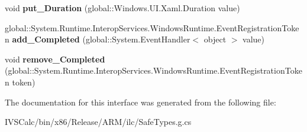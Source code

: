 \begin{DoxyCompactItemize}
\mbox{\label{interface_windows_1_1_u_i_1_1_xaml_1_1_media_1_1_animation_1_1_i_timeline_aa1793004fef03b01c0341256ede164d9}} 
void {\bfseries put\+\_\+\+Duration} (global\+::\+Windows.\+U\+I.\+Xaml.\+Duration value)
\item 
\mbox{\label{interface_windows_1_1_u_i_1_1_xaml_1_1_media_1_1_animation_1_1_i_timeline_a7ee61c5d3a53c5f8570e743522b52866}} 
global\+::\+System.\+Runtime.\+Interop\+Services.\+Windows\+Runtime.\+Event\+Registration\+Token {\bfseries add\+\_\+\+Completed} (global\+::\+System.\+Event\+Handler$<$ object $>$ value)
\item 
\mbox{\label{interface_windows_1_1_u_i_1_1_xaml_1_1_media_1_1_animation_1_1_i_timeline_a633d5239301849202b3e61b320bed13b}} 
void {\bfseries remove\+\_\+\+Completed} (global\+::\+System.\+Runtime.\+Interop\+Services.\+Windows\+Runtime.\+Event\+Registration\+Token token)
\end{DoxyCompactItemize}


The documentation for this interface was generated from the following file\+:\begin{DoxyCompactItemize}
\item 
I\+V\+S\+Calc/bin/x86/\+Release/\+A\+R\+M/ilc/Safe\+Types.\+g.\+cs\end{DoxyCompactItemize}

